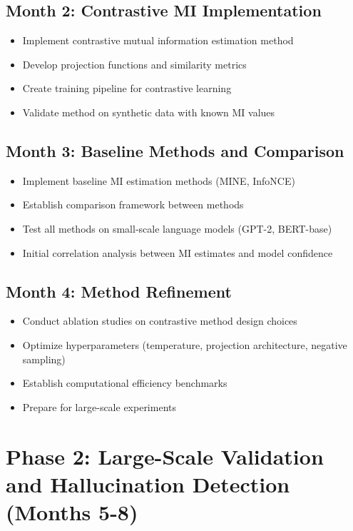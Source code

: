 \documentclass[11pt, oneside]{book}
\theoremstyle{plain}
\theoremstyle{definition}
\theoremstyle{remark}
\begin{document}
\subsection{Month 2: Contrastive MI Implementation}
\begin{itemize}
    \item Implement contrastive mutual information estimation method
    \item Develop projection functions and similarity metrics
    \item Create training pipeline for contrastive learning
    \item Validate method on synthetic data with known MI values
\end{itemize}

\subsection{Month 3: Baseline Methods and Comparison}
\begin{itemize}
    \item Implement baseline MI estimation methods (MINE, InfoNCE)
    \item Establish comparison framework between methods
    \item Test all methods on small-scale language models (GPT-2, BERT-base)
    \item Initial correlation analysis between MI estimates and model confidence
\end{itemize}

\subsection{Month 4: Method Refinement}
\begin{itemize}
    \item Conduct ablation studies on contrastive method design choices
    \item Optimize hyperparameters (temperature, projection architecture, negative sampling)
    \item Establish computational efficiency benchmarks
    \item Prepare for large-scale experiments
\end{itemize}

\section{Phase 2: Large-Scale Validation and Hallucination Detection (Months 5-8)}
\end{document}
